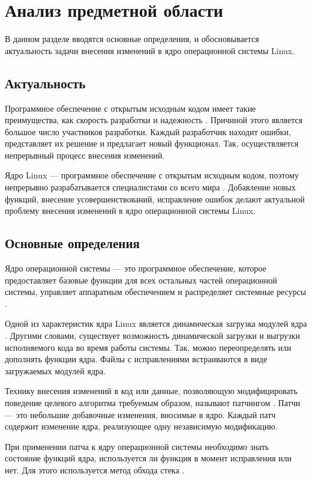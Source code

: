 \chapter{Анализ предметной области}

В данном разделе вводятся основные определения, и обосновывается актуальность задачи внесения изменений в ядро операционной системы Linux.

\section{Актуальность}

Программное обеспечение с открытым исходным кодом имеет такие преимущества, как скорость разработки и надежность \cite{open-source}. Причиной этого является большое число участников разработки. Каждый разработчик находит ошибки, представляет их решение и предлагает новый функционал. Так, осуществляется непрерывный процесс внесения изменений.

Ядро Linux --- программное обеспечение с открытым исходным кодом, поэтому непрерывно разрабатывается специалистами со всего мира \cite{statistics}. Добавление новых функций, внесение усовершенствований, исправление ошибок делают актуальной проблему внесения изменений в ядро операционной системы Linux.

\section{Основные определения}

Ядро операционной системы --- это программное обеспечение, которое предоставляет базовые функции для всех остальных частей операционной системы, управляет аппаратным обеспечением и распределяет системные ресурсы \cite{linux}.

Одной из характеристик ядра Linux является динамическая загрузка модулей ядра \cite{modules}. Другими словами, существует возможность динамической загрузки и выгрузки исполняемого кода во время работы системы. Так, можно переопределять или дополнять функции ядра. Файлы с исправлениями встраиваются в виде загружаемых модулей ядра.

Технику внесения изменений в код или данные, позволяющую модифицировать поведение целевого алгоритма требуемым образом, называют патчингом \cite{patching}. Патчи --- это небольшие добавочные изменения, вносимые в ядро. Каждый патч содержит изменение ядра, реализующее одну независимую модификацию.

При применении патча к ядру операционной системы необходимо знать состояние функций ядра, используется ли функция в момент исправления или нет. Для этого используется метод обхода стека \cite{lucos}.

